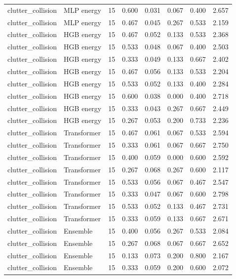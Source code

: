 {\begin{longtable}{llrrrrrr}
clutter\_collision & MLP energy & 15 & 0.600 & 0.031 & 0.067 & 0.400 & 2.657 \\
clutter\_collision & MLP energy & 15 & 0.467 & 0.045 & 0.267 & 0.533 & 2.159 \\
clutter\_collision & HGB energy & 15 & 0.467 & 0.052 & 0.133 & 0.533 & 2.368 \\
clutter\_collision & HGB energy & 15 & 0.533 & 0.048 & 0.067 & 0.400 & 2.503 \\
clutter\_collision & HGB energy & 15 & 0.333 & 0.049 & 0.133 & 0.667 & 2.402 \\
clutter\_collision & HGB energy & 15 & 0.467 & 0.056 & 0.133 & 0.533 & 2.204 \\
clutter\_collision & HGB energy & 15 & 0.533 & 0.052 & 0.133 & 0.400 & 2.284 \\
clutter\_collision & HGB energy & 15 & 0.600 & 0.038 & 0.000 & 0.400 & 2.718 \\
clutter\_collision & HGB energy & 15 & 0.333 & 0.043 & 0.267 & 0.667 & 2.449 \\
clutter\_collision & HGB energy & 15 & 0.267 & 0.053 & 0.200 & 0.733 & 2.236 \\
clutter\_collision & Transformer & 15 & 0.467 & 0.061 & 0.067 & 0.533 & 2.594 \\
clutter\_collision & Transformer & 15 & 0.333 & 0.061 & 0.067 & 0.667 & 2.750 \\
clutter\_collision & Transformer & 15 & 0.400 & 0.059 & 0.000 & 0.600 & 2.592 \\
clutter\_collision & Transformer & 15 & 0.267 & 0.068 & 0.267 & 0.600 & 2.117 \\
clutter\_collision & Transformer & 15 & 0.533 & 0.056 & 0.067 & 0.467 & 2.547 \\
clutter\_collision & Transformer & 15 & 0.333 & 0.047 & 0.067 & 0.600 & 2.798 \\
clutter\_collision & Transformer & 15 & 0.533 & 0.052 & 0.133 & 0.467 & 2.731 \\
clutter\_collision & Transformer & 15 & 0.333 & 0.059 & 0.133 & 0.667 & 2.671 \\
clutter\_collision & Ensemble & 15 & 0.400 & 0.056 & 0.267 & 0.533 & 2.084 \\
clutter\_collision & Ensemble & 15 & 0.267 & 0.068 & 0.067 & 0.667 & 2.652 \\
clutter\_collision & Ensemble & 15 & 0.133 & 0.073 & 0.200 & 0.800 & 2.167 \\
clutter\_collision & Ensemble & 15 & 0.333 & 0.059 & 0.200 & 0.600 & 2.072 \\

\end{longtable}}
